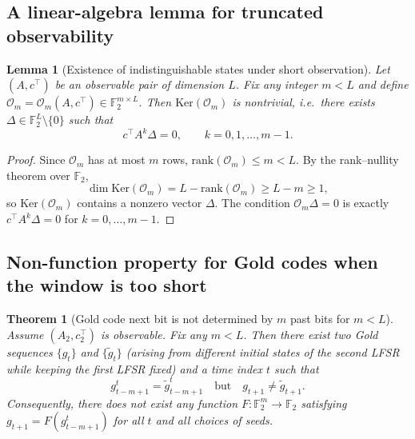 \documentclass[12pt,a4paper]{report}
\newcommand{\F}{\mathbb{F}}
\newcommand{\rank}{\mathrm{rank}}
\newcommand{\Ker}{\mathrm{Ker}}
\theoremstyle{plain}
\newtheorem{thm}{Theorem}
\newtheorem{lem}{Lemma}
\begin{document}
\subsection{A linear-algebra lemma for truncated observability}

\begin{lem}[Existence of indistinguishable states under short observation]
\label{lem:short_obs_kernel}
Let $(A,c^\top)$ be an observable pair of dimension $L$. Fix any integer $m<L$ and define
$\mathcal{O}_m=\mathcal{O}_m(A,c^\top)\in \F_2^{m\times L}$.
Then $\Ker(\mathcal{O}_m)$ is nontrivial, i.e.\ there exists $\Delta\in \F_2^L\setminus\{0\}$
such that
\begin{equation}
c^\top A^k \Delta = 0,\qquad k=0,1,\dots,m-1.
\end{equation}
\end{lem}

\begin{proof}
Since $\mathcal{O}_m$ has at most $m$ rows, $\rank(\mathcal{O}_m)\le m < L$.
By the rank--nullity theorem over $\F_2$,
\[
\dim \Ker(\mathcal{O}_m) = L-\rank(\mathcal{O}_m) \ge L-m \ge 1,
\]
so $\Ker(\mathcal{O}_m)$ contains a nonzero vector $\Delta$.
The condition $\mathcal{O}_m \Delta = 0$ is exactly $c^\top A^k \Delta=0$ for $k=0,\dots,m-1$.
\end{proof}

\subsection{Non-function property for Gold codes when the window is too short}

\begin{thm}[Gold code next bit is not determined by $m$ past bits for $m<L$]
\label{thm:gold_not_function_m_less_L}
Assume $(A_2,c_2^\top)$ is observable. Fix any $m<L$.
Then there exist two Gold sequences $\{g_t\}$ and $\{\tilde g_t\}$ (arising from different
initial states of the \emph{second} LFSR while keeping the first LFSR fixed) and a time index $t$
such that
\begin{equation}
g_{t-m+1}^t = \tilde g_{t-m+1}^t
\quad \text{but}\quad
g_{t+1}\neq \tilde g_{t+1}.
\end{equation}
Consequently, there does not exist any function $F:\F_2^m\to \F_2$ satisfying
$g_{t+1}=F(g_{t-m+1}^t)$ for all $t$ and all choices of seeds.
\end{thm}
\end{document}
